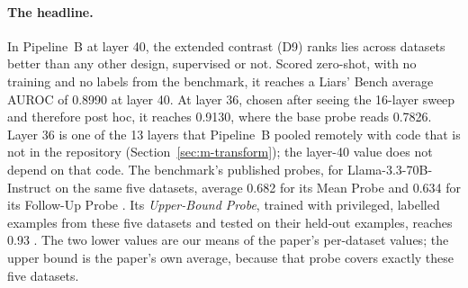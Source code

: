 \paragraph{The headline.} In Pipeline~B at layer 40, the extended contrast (D9) ranks lies across datasets better than any other design, supervised or not. %
Scored zero-shot, with no training and no labels from the benchmark, it reaches a Liars' Bench average AUROC of 0.8990 at layer 40. %
At layer 36, chosen after seeing the 16-layer sweep and therefore post hoc, it reaches 0.9130, where the base probe reads 0.7826. %
Layer 36 is one of the 13 layers that Pipeline~B pooled remotely with code that is not in the repository (Section~\ref{sec:m-transform}); the layer-40 value does not depend on that code. %
The benchmark's published probes, for Llama-3.3-70B-Instruct on the same five datasets, average 0.682 for its Mean Probe and 0.634 for its Follow-Up Probe \parencite[pp.~54--55]{kretschmar2025liars}. %
Its \emph{Upper-Bound Probe}, trained with privileged, labelled examples from these five datasets and tested on their held-out examples, reaches 0.93 \parencite[pp.~8, 56]{kretschmar2025liars}. %
The two lower values are our means of the paper's per-dataset values; the upper bound is the paper's own average, because that probe covers exactly these five datasets. %
